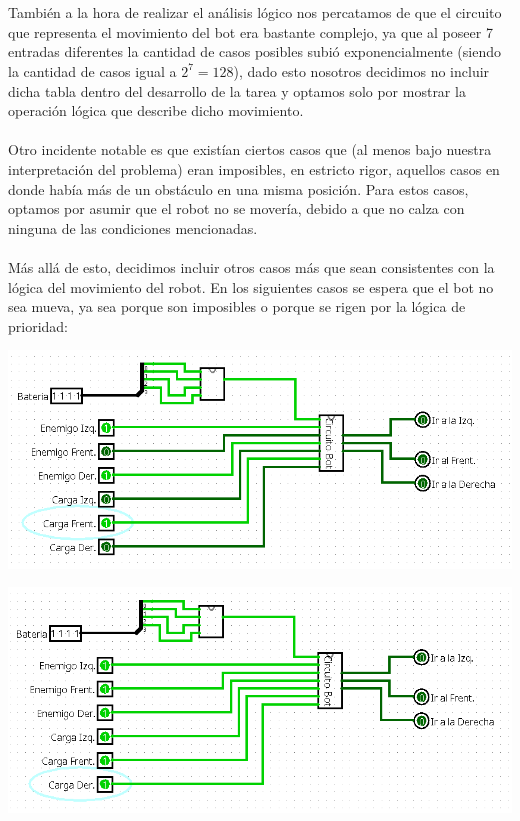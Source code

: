\documentclass[a4paper]{article}
\begin{document}
\\\\
También a la hora de realizar el análisis lógico nos percatamos de que el circuito que representa el movimiento del bot era bastante complejo, ya que al poseer 7 entradas diferentes la cantidad de casos posibles subió exponencialmente (siendo la cantidad de casos igual a $2^7 = 128$), dado esto nosotros decidimos no incluir dicha tabla dentro del desarrollo de la tarea y optamos solo por mostrar la operación lógica que describe dicho movimiento.
\\\\
Otro incidente notable es que existían ciertos casos que (al menos bajo nuestra interpretación del problema) eran imposibles, en estricto rigor, aquellos casos en donde había más de un obstáculo en una misma posición. Para estos casos, optamos por asumir que el robot no se movería, debido a que no calza con ninguna de las condiciones mencionadas.
\\\\
Más allá de esto, decidimos incluir otros casos más que sean consistentes con la lógica del movimiento del robot. En los siguientes casos se espera que el bot no sea mueva, ya sea porque son imposibles o porque se rigen por la lógica de prioridad:
\begin{center}
    \includegraphics[width=1\textwidth]{tarea-1-ej-7.png} %
\end{center}
\begin{center}
    \includegraphics[width=1\textwidth]{tarea-1-ej-8.png} %
\end{center}
\end{document}
